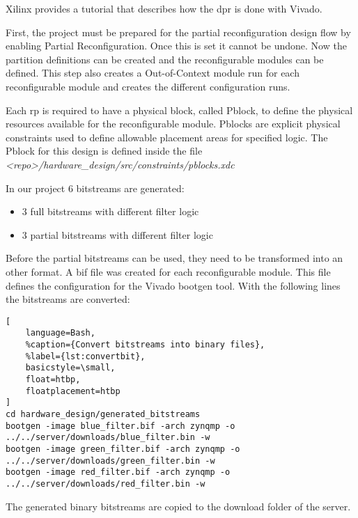 Xilinx provides a tutorial \cite{UG947} that describes how the \gls{dpr} is done with Vivado. 

First, the project must be prepared for the partial reconfiguration design flow by enabling Partial Reconfiguration. Once this is set it cannot be undone. Now the partition definitions can be created and the reconfigurable modules can be defined. This step also creates a Out-of-Context module run for each reconfigurable module and creates the different configuration runs.

Each \gls{rp} is required to have a physical block, called Pblock, to define the physical resources available for the reconfigurable module. Pblocks are explicit physical constraints used to define allowable placement areas for specified logic. The Pblock for this design is defined inside the file\\\emph{<repo>/hardware\_design/src/constraints/pblocks.xdc}

In our project $6$ bitstreams are generated:
\begin{itemize}
	\item $3$ full bitstreams with different filter logic
	\item $3$ partial bitstreams with different filter logic
\end{itemize}

Before the partial bitstreams can be used, they need to be transformed into an other format. A \gls{bif} file was created for each reconfigurable module. This file defines the configuration for the Vivado bootgen tool. With the following lines the bitstreams are converted:

\begin{lstlisting}[
    language=Bash,
    %caption={Convert bitstreams into binary files},
    %label={lst:convertbit},
    basicstyle=\small,
    float=htbp,
    floatplacement=htbp
]
cd hardware_design/generated_bitstreams
bootgen -image blue_filter.bif -arch zynqmp -o ../../server/downloads/blue_filter.bin -w
bootgen -image green_filter.bif -arch zynqmp -o ../../server/downloads/green_filter.bin -w
bootgen -image red_filter.bif -arch zynqmp -o ../../server/downloads/red_filter.bin -w
\end{lstlisting}

The generated binary bitstreams are copied to the download folder of the server.
